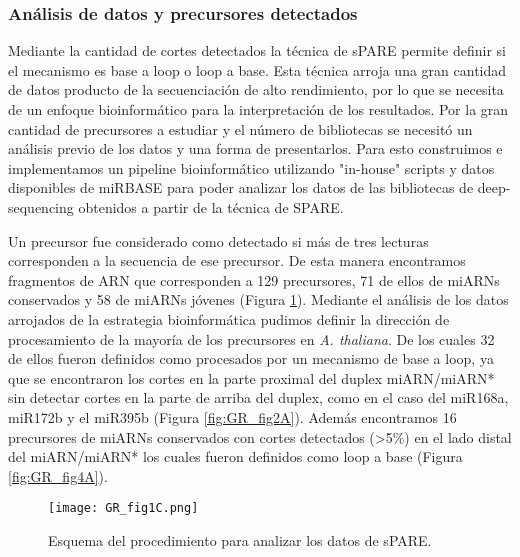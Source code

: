 \subsubsection{Análisis de datos y precursores detectados}
Mediante la cantidad de cortes detectados la técnica de sPARE permite definir si el mecanismo es base a loop o loop a base.
Esta técnica arroja una gran cantidad de datos producto de la secuenciación de alto rendimiento, por lo que se necesita de un enfoque bioinformático para la interpretación de los resultados.
Por la gran cantidad de precursores a estudiar y el número de bibliotecas se necesitó un análisis previo de los datos y una forma de presentarlos.
Para esto construimos e implementamos un pipeline bioinformático utilizando "in-house" scripts y datos disponibles de miRBASE para poder analizar los datos de las bibliotecas de deep-sequencing obtenidos a partir de la técnica de SPARE.

Un precursor fue considerado como detectado si más de tres lecturas corresponden a la secuencia de ese precursor.
De esta manera encontramos fragmentos de ARN que corresponden a 129 precursores, 71 de ellos de miARNs conservados y 58 de miARNs jóvenes (Figura \ref{fig:GR_fig1C}).
Mediante el análisis de los datos arrojados de la estrategia bioinformática pudimos definir la dirección de procesamiento de la mayoría de los precursores en \textit{A. thaliana}.
De los cuales 32 de ellos fueron definidos como procesados por un mecanismo de base a loop, ya que se encontraron los cortes en la parte proximal del duplex miARN/miARN* sin detectar cortes en la parte de arriba del duplex, como en el caso del miR168a, miR172b y el miR395b (Figura \ref{fig:GR_fig2A}).
Además encontramos 16 precursores de miARNs conservados con cortes detectados (>5\%) en el lado distal del miARN/miARN* los cuales fueron definidos como loop a base (Figura \ref{fig:GR_fig4A}).

\begin{figure}[htbp!] 
    \centering    
    \texttt{[image: GR\_fig1C.png]}
    \caption[Esquema del procedimiento para analizar los datos de sPARE]{Esquema del procedimiento para analizar los datos de sPARE.}
    \label{fig:GR_fig1C}
\end{figure}


